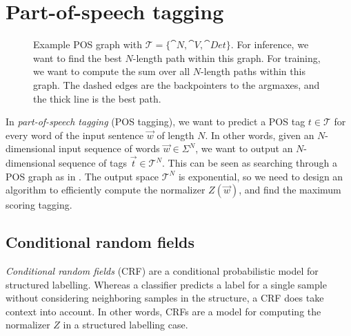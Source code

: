 \section{Part-of-speech tagging} \label{sec:pos-tagging}

\begin{figure}[h!]
    \centering
    \caption{Example POS graph with $\mathcal{T} = \{ \cat{N}, \cat{V},
    \cat{Det} \}$. For inference, we want to find the best $N$-length path
    within this graph. For training, we want to compute the sum over all
    $N$-length paths within this graph. The dashed edges are the backpointers to
    the argmaxes, and the thick line is the best path.}
    \label{fig:pos-graph}
\end{figure}

In \textit{part-of-speech tagging} (POS tagging), we want to predict a POS tag
$t\in\mathcal{T}$ for every word of the input sentence $\vec{w}$ of length $N$.
In other words, given an $N$-dimensional input sequence of words $\vec{w} \in
\Sigma^N$, we want to output an $N$-dimensional sequence of tags $\vec{t} \in
\mathcal{T}^N$. This can be seen as searching through a POS graph as in
. The output space $\mathcal{T}^N$ is exponential, so we
need to design an algorithm to efficiently compute the normalizer $Z(\vec{w})$,
and find the maximum scoring tagging.

\subsection{Conditional random fields}

\textit{Conditional random fields} (CRF) are a conditional probabilistic model
for structured labelling. Whereas a classifier predicts a label for a single
sample without considering neighboring samples in the structure, a CRF does
take context into account. In other words, CRFs are a model for computing the
normalizer $Z$ in a structured labelling case.


